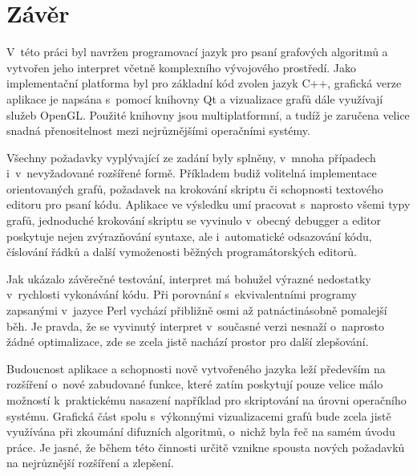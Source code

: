 \documentclass[11pt,twoside,a4paper]{book}
\begin{document}



\chapter{Závěr}


V~této práci byl navržen programovací jazyk pro psaní grafových algoritmů a vytvořen jeho interpret včetně komplexního vývojového prostředí. Jako implementační platforma byl pro základní kód zvolen jazyk C++, grafická verze aplikace je napsána s~pomocí knihovny Qt a vizualizace grafů dále využívají služeb OpenGL. Použité knihovny jsou multiplatformní, a tudíž je zaručena velice snadná přenositelnost mezi nejrůznějšími operačními systémy.

Všechny požadavky vyplývající ze zadání byly splněny, v~mnoha případech i~v~nevyžadované rozšířené formě. Příkladem budiž volitelná implementace orientovaných grafů, požadavek na krokování skriptu či schopnosti textového editoru pro psaní kódu. Aplikace ve výsledku umí pracovat s~naprosto všemi typy grafů, jednoduché krokování skriptu se vyvinulo v~obecný debugger a editor poskytuje nejen zvýrazňování syntaxe, ale i~automatické odsazování kódu, číslování řádků a další vymoženosti běžných programátorských editorů.

Jak ukázalo závěrečné testování, interpret má bohužel výrazné nedostatky v~rychlosti vykonávání kódu. Při porovnání s~ekvivalentními programy zapsanými v~jazyce Perl vychází přibližně osmi až patnáctinásobně pomalejší běh. Je pravda, že se vyvinutý interpret v~sou\-čas\-né verzi nesnaží o~naprosto žádné optimalizace, zde se zcela jistě nachází prostor pro další zlepšování.

Budoucnost aplikace a schopnosti nově vytvořeného jazyka leží především na rozšíření o~nové zabudované funkce, které zatím poskytují pouze velice málo možností k~praktickému nasazení například pro skriptování na úrovni operačního systému. Grafická část spolu s~výkonnými vizualizacemi grafů bude zcela jistě využívána při zkoumání difuzních algoritmů, o~nichž byla řeč na samém úvodu práce. Je jasné, že během této činnosti určitě vznikne spousta nových požadavků na nejrůznější rozšíření a zlepšení.
\end{document}
